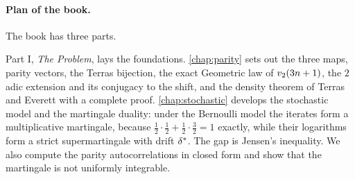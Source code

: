 \paragraph{Plan of the book.} The book has three parts.

Part I, \emph{The Problem}, lays the foundations. \cref{chap:parity} sets out
the three maps, parity vectors, the Terras bijection, the exact Geometric law
of $v_2(3n+1)$, the $2$ adic extension and its conjugacy to the shift, and the
density theorem of Terras and Everett with a complete proof.
\cref{chap:stochastic} develops the stochastic model and the martingale
duality: under the Bernoulli model the iterates form a multiplicative
martingale, because $\tfrac12\cdot\tfrac12+\tfrac12\cdot\tfrac32=1$ exactly,
while their logarithms form a strict supermartingale with drift $\delta^{*}$. The gap
is Jensen's inequality. We also compute the parity autocorrelations in closed
form and show that the martingale is not uniformly integrable.

